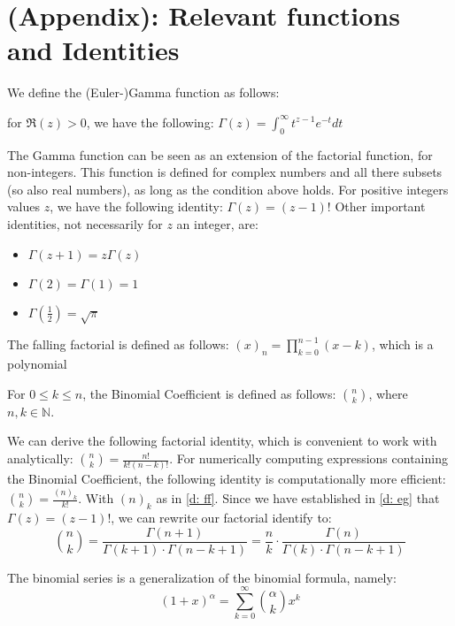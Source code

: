 \section{(Appendix): Relevant functions and Identities}\label{s:appendices}
We define the (Euler-)Gamma function as follows:
\begin{definition}\label{d: eg}
    for \(\Re(z) > 0\), we have the following: \(\Gamma(z) = \int_{0}^{\infty} t^{z-1} e^{-t} dt\)
\end{definition}

The Gamma function can be seen as an extension of the factorial function, for non-integers. This function is defined for complex numbers and all there subsets (so also real numbers), as long as the condition above holds. For positive integers values \(z\), we have the following identity: \(\Gamma(z) = (z - 1)!\)
Other important identities, not necessarily for \(z\) an integer, are: 
\begin{itemize}
    \item \(\Gamma(z + 1) = z \Gamma(z)\)
    \item \(\Gamma(2) = \Gamma(1) = 1\)
    \item \(\Gamma(\frac{1}{2}) = \sqrt{\pi}\)
\end{itemize}

\begin{definition}\label{d: ff}
    The falling factorial is defined as follows: \((x)_n = \prod_{k = 0}^{n - 1} (x - k)\), which is a polynomial
\end{definition}
\begin{definition}
    For \(0 \leq k \leq n\), the Binomial Coefficient is defined as follows: \(\binom{n}{k}\), where \(n, k \in \mathbb{N}\).
\end{definition}
We can derive the following factorial identity, which is convenient to work with analytically: \(\binom{n}{k} = \frac{n!}{k! (n - k)!}\).
For numerically computing expressions containing the Binomial Coefficient, the following identity is computationally more efficient: \(\binom{n}{k} = \frac{(n)_k}{k!}\). With \((n)_k\) as in \ref{d: ff}.
Since we have established in \ref{d: eg} that \(\Gamma(z) = (z - 1)!\), we can rewrite our factorial identify to:
\[\binom{n}{k} = \frac{\Gamma(n + 1)}{\Gamma(k + 1) \cdot \Gamma( n - k  + 1)} = \frac{n}{k} \cdot\frac{\Gamma(n)}{\Gamma(k) \cdot \Gamma(n - k + 1)}\]

\begin{definition}\label{d: binomial}
    The binomial series is a generalization of the binomial formula, namely:
    \[(1 + x)^\alpha = \sum_{k = 0}^{\infty}\binom{\alpha}{k} x^k\]
\end{definition}

